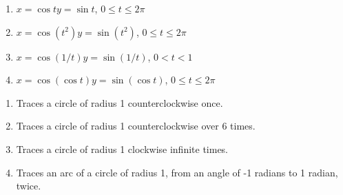 {\begin{enumerate}
\item		$x=\cos t$\quad $y=\sin t$, \quad $0\leq t\leq 2\pi$
\item		$x=\cos (t^2)$\quad $y=\sin(t^2)$, \quad $0\leq t\leq 2\pi$
\item		$x=\cos (1/t)$\quad $y=\sin(1/t)$, \quad $0<t<1$
\item		$x=\cos(\cos t)$\quad $y=\sin(\cos t)$, \quad $0\leq t\leq 2\pi$
\end{enumerate}
}
{\begin{enumerate}
	\item Traces a circle of radius 1 counterclockwise once.
	\item	Traces a circle of radius 1 counterclockwise over 6 times.
	\item	Traces a circle of radius 1 clockwise infinite times.
	\item	Traces an arc of a circle of radius 1, from an angle of -1 radians to 1 radian, twice.
\end{enumerate}
}